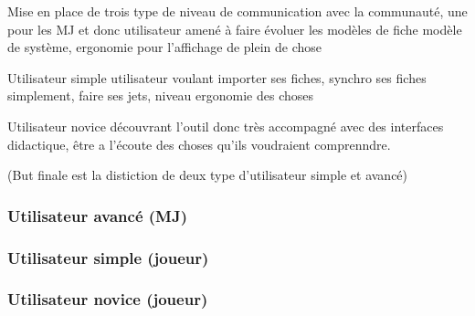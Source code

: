 \documentclass[11pt,a4paper]{report}
\begin{document}
Mise en place de trois type de niveau de communication avec la communauté,
une pour les MJ et donc utilisateur amené à faire évoluer les modèles de fiche
modèle de système, ergonomie pour l'affichage de plein de chose

Utilisateur simple utilisateur voulant importer ses fiches, synchro ses fiches
simplement, faire ses jets, niveau ergonomie des choses

Utilisateur novice découvrant l'outil donc très accompagné avec des interfaces
didactique, être a l'écoute des choses qu'ils voudraient comprenndre.

(But finale est la distiction de deux type d'utilisateur simple et avancé)

\subsubsection{Utilisateur avancé (MJ)}

\subsubsection{Utilisateur simple (joueur)}

\subsubsection{Utilisateur novice (joueur)}
  
\end{document}
